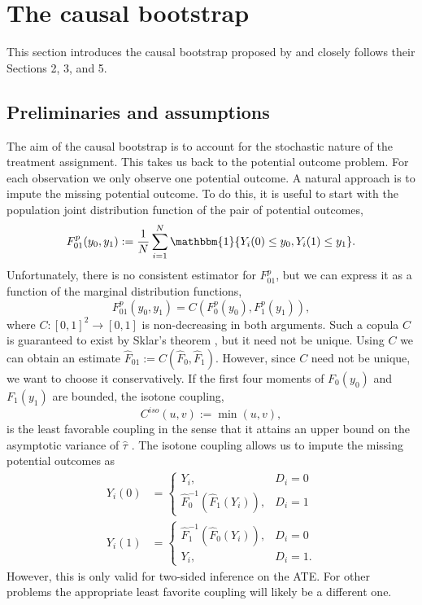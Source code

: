 \documentclass[aodsor,preprint]{imsart}
\numberwithin{equation}{section}
\theoremstyle{plain}
\newcommand{\ind}{\mathbbm{1}} %
\begin{document}
\section{The causal bootstrap} \label{bootstrap}

This section introduces the causal bootstrap proposed by \cite{Imbens_2021} and closely follows their Sections 2, 3, and 5.

\subsection{Preliminaries and assumptions}
The aim of the causal bootstrap is to account for the stochastic nature of the treatment assignment. This takes us back to the potential outcome problem. For each observation we only observe one potential outcome. A natural approach is to impute the missing potential outcome. To do this, it is useful to start with the population joint distribution function of the pair of potential outcomes,
$$
F_{01}^p (y_0, y_1) := \frac{1}{N} \sum_{i = 1}^{N} \ind\{Y_i(0) \leq y_0, Y_i(1) \leq y_1\}.
$$
Unfortunately, there is no consistent estimator for $F_{01}^p$, but we can express it as a function of the marginal distribution functions,
$$
F_{01}^p (y_0, y_1) = C(F_0^p(y_0), F_1^p(y_1)),
$$
where $C: [0, 1]^2 \to [0, 1]$ is non-decreasing in both arguments. Such a copula $C$ is guaranteed to exist by Sklar's theorem \citep[see for example][]{Nelsen_2007}, but it need not be unique. Using $C$ we can obtain an estimate $\widehat{F}_{01} := C(\widehat{F}_0, \widehat{F}_1)$. However, since $C$ need not be unique, we want to choose it conservatively. If the first four moments of $F_0(y_0)$ and $F_1(y_1)$ are bounded, the isotone coupling,
$$
C^{iso}(u, v) := \min(u, v),
$$
is the least favorable coupling in the sense that it attains an upper bound on the asymptotic variance of $\widehat{\tau}$ \citep[][Sections 2.4 and 2.5]{Imbens_2021}. The isotone coupling allows us to impute the missing potential outcomes as
\begin{align} \label{imputation1}
	Y_i(0) &= \begin{cases}
		Y_i, & D_i = 0 \\
		\widehat{F}_0^{-1}(\widehat{F}_1(Y_i)), & D_i = 1
	\end{cases} \\
	\label{imputation2}
	Y_i(1) &= \begin{cases}
		\widehat{F}_1^{-1}(\widehat{F}_0(Y_i)), & D_i = 0 \\
		Y_i, & D_i = 1.
	\end{cases}
\end{align}
However, this is only valid for two-sided inference on the ATE. For other problems the appropriate least favorite coupling will likely be a different one.
\end{document}
